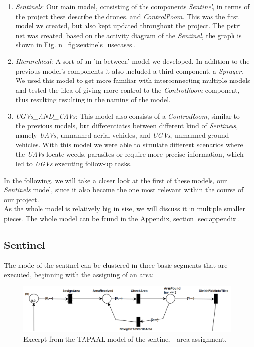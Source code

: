 \documentclass[english]{lni}
\begin{document}
\begin{enumerate}
  \item \textit{Sentinels}: Our main model, consisting of the components \textit{Sentinel}, in terms of the project these describe the drones, and \textit{ControlRoom}. This was the first model we created, but also kept updated throughout the project. The petri net was created, based on the activity diagram of the \textit{Sentinel}, the graph is shown in Fig. n. \ref{fig:sentinels_usecases}.
  \item \textit{Hierarchical}: A sort of an 'in-between' model we developed. In addition to the previous model's components it also included a third component, a \textit{Sprayer}. We used this model to get more familiar with interconnecting multiple models and tested the idea of giving more control to the \textit{ControlRoom} component, thus resulting resulting in the naming of the model.
  \item \textit{UGVs\_AND\_UAVs}: This model also consists of a \textit{ControlRoom}, similar to the previous models, but differentiates between different kind of \textit{Sentinels}, namely \textit{UAVs}, unmanned aerial vehicles, and \textit{UGVs}, unmanned ground vehicles. With this model we were able to simulate different scenarios where the \textit{UAVs} locate weeds, parasites or require more precise information, which led to \textit{UGVs} executing follow-up tasks.
\end{enumerate}
In the following, we will take a closer look at the first of these models, our \textit{Sentinels} model, since it also became the one most relevant within the course of our project.\\
As the whole model is relatively big in size, we will discuss it in multiple smaller pieces. The whole model can be found in the Appendix, section \ref{sec:appendix}.\\


\subsection{Sentinel}
The mode of the sentinel can be clustered in three basic segments that are executed, beginning with the assigning of an area:
\begin{figure}[H]
    \centering
    \includegraphics[width = 12cm]{img/sentinel_part1.png}
    \caption{Excerpt from the TAPAAL model of the sentinel - area assignment.}
    \label{fig:sentinel_1}
\end{figure}
\end{document}
